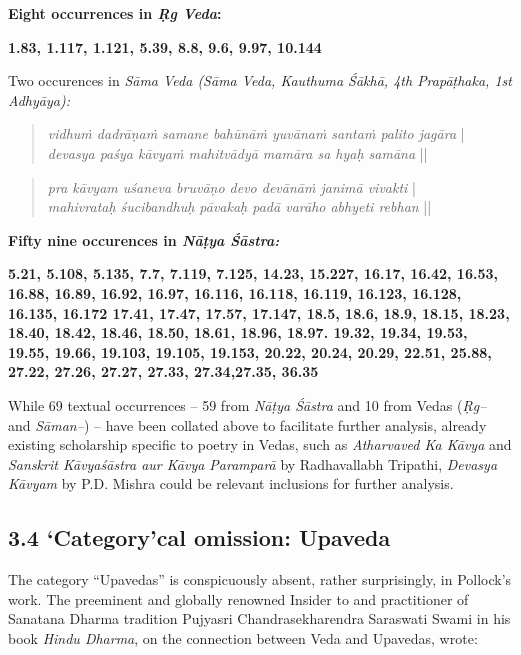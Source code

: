 \textbf{Eight occurrences in \textit{Ṛg Veda}:}

\textbf{1.83, 1.117, 1.121, 5.39, 8.8, 9.6, 9.97, 10.144}

Two occurences in \textit{Sāma Veda (Sāma Veda, Kauthuma Śākhā, 4th Prapāṭhaka, 1st Adhyāya):}

\begin{verse}
\textit{vidhuṁ dadrāṇaṁ samane bahūnāṁ yuvānaṁ santaṁ palito jagāra} |\\\textit{devasya paśya kāvyaṁ mahitvādyā mamāra sa hyaḥ samāna} || 
\end{verse}

\begin{verse}
\textit{pra kāvyam uśaneva bruvāṇo devo devānāṁ janimā vivakti} |\\\textit{mahivrataḥ śucibandhuḥ pāvakaḥ padā varāho abhyeti rebhan} || 
\end{verse}

\textbf{Fifty nine occurences in \textit{Nāṭya Śāstra:}}

\textbf{5.21, 5.108, 5.135, 7.7, 7.119, 7.125, 14.23, 15.227, 16.17, 16.42, 16.53, 16.88, 16.89, 16.92, 16.97, 16.116, 16.118, 16.119, 16.123, 16.128, 16.135, 16.172 17.41, 17.47, 17.57, 17.147, 18.5, 18.6, 18.9, 18.15, 18.23, 18.40, 18.42, 18.46, 18.50, 18.61, 18.96, 18.97. 19.32, 19.34, 19.53, 19.55, 19.66, 19.103, 19.105, 19.153, 20.22, 20.24, 20.29, 22.51, 25.88, 27.22, 27.26, 27.27, 27.33, 27.34,27.35, 36.35}

While 69 textual occurrences – 59 from \textit{Nāṭya Śāstra} and 10 from Vedas (\textit{Ṛg–} and \textit{Sāman–}) – have been collated above to facilitate further analysis, already existing scholarship specific to poetry in Vedas, such as \textit{Atharvaved Ka Kāvya} and \textit{Sanskrit Kāvyaśāstra aur Kāvya Paramparā} by Radhavallabh Tripathi, \textit{Devasya Kāvyam} by P.D. Mishra could be relevant inclusions for further analysis.


\subsection*{3.4 ‘Category'cal omission: Upaveda}

The category “Upavedas” is conspicuously absent, rather surprisingly, in Pollock’s work. The preeminent and globally renowned Insider to and practitioner of Sanatana Dharma tradition Pujyasri Chandrasekha\-rendra Saraswati Swami in his book \textit{Hindu Dharma}, on the connection between Veda and Upavedas, wrote:

